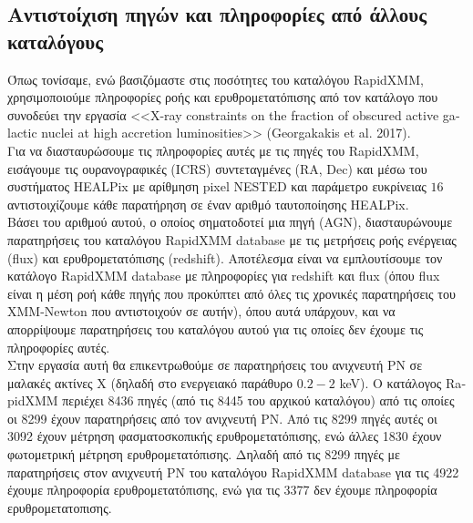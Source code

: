 
\subsection{Αντιστοίχιση πηγών και πληροφορίες από άλλους καταλόγους}

Όπως τονίσαμε, ενώ βασιζόμαστε στις ποσότητες του καταλόγου \textlatin{RapidXMM}, χρησιμοποιούμε πληροφορίες ροής και ερυθρομετατόπισης από τον κατάλογο που συνοδεύει την εργασία \textlatin{<<X-ray constraints on the fraction of obscured active galactic nuclei at high accretion luminosities>> (Georgakakis et al. 2017)}.\\
Για να διασταυρώσουμε τις πληροφορίες αυτές με τις πηγές του \textlatin{RapidXMM}, εισάγουμε τις ουρανογραφικές (\textlatin{ICRS}) συντεταγμένες (\textlatin{RA}, \textlatin{Dec}) και μέσω του συστήματος \textlatin{HEALPix} με αρίθμηση \textlatin{pixel NESTED} και παράμετρο ευκρίνειας $16$ αντιστοιχίζουμε κάθε παρατήρηση σε έναν αριθμό ταυτοποίησης \textlatin{HEALPix}.\\
Βάσει του αριθμού αυτού, ο οποίος σηματοδοτεί μια πηγή (\textlatin{AGN}), διασταυρώνουμε παρατηρήσεις του καταλόγου \textlatin{RapidXMM database} με τις μετρήσεις ροής ενέργειας (\textlatin{flux}) και ερυθρομετατόπισης (\textlatin{redshift}). Αποτέλεσμα είναι να εμπλουτίσουμε τον κατάλογο \textlatin{RapidXMM database} με πληροφορίες για \textlatin{redshift} και \textlatin{flux} (όπου \textlatin{flux} είναι η μέση ροή κάθε πηγής που προκύπτει από όλες τις χρονικές παρατηρήσεις του \textlatin{XMM-Newton} που αντιστοιχούν σε αυτήν), όπου αυτά υπάρχουν, και να απορρίψουμε παρατηρήσεις του καταλόγου αυτού για τις οποίες δεν έχουμε τις πληροφορίες αυτές.\\
Στην εργασία αυτή θα επικεντρωθούμε σε παρατηρήσεις του ανιχνευτή ΡΝ σε μαλακές ακτίνες Χ (δηλαδή στο ενεργειακό παράθυρο $0.2-2$ \textlatin{keV}).
Ο κατάλογος \textlatin{RapidXMM} περιέχει 8436 πηγές (από τις 8445 του αρχικού καταλόγου) από τις οποίες οι 8299 έχουν παρατηρήσεις από τον ανιχνευτή ΡΝ. Από τις 8299 πηγές αυτές οι 3092 έχουν μέτρηση φασματοσκοπικής ερυθρομετατόπισης, ενώ άλλες 1830 έχουν φωτομετρική μέτρηση ερυθρομετατόπισης. Δηλαδή από τις 8299 πηγές με παρατηρήσεις στον ανιχνευτή ΡΝ του καταλόγου \textlatin{RapidXMM database} για τις 4922 έχουμε πληροφορία ερυθρομετατόπισης, ενώ για τις 3377 δεν έχουμε πληροφορία ερυθρομετατοπισης.

